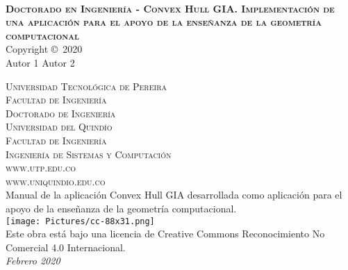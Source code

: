 
\newpage
~\vfill
\thispagestyle{empty}

\noindent \textbf{\textsc{Doctorado en Ingeniería - Convex Hull GIA. Implementación de una aplicación para el apoyo de la enseñanza de la geometría computacional}}\\ %

\noindent Copyright \copyright\ 2020\\
Autor 1
Autor 2

\noindent \textsc{Universidad Tecnológica de Pereira \\ Facultad de Ingeniería \\Doctorado de Ingeniería}\\
\noindent \textsc{Universidad del Quindío \\ Facultad de Ingeniería \\Ingeniería de Sistemas y Computación}\\

\noindent \textsc{www.utp.edu.co}\\
\noindent \textsc{www.uniquindio.edu.co}\\

\noindent Manual de la aplicación Convex Hull GIA desarrollada como aplicación para el apoyo de la enseñanza de la geometría computacional.\\


\texttt{[image: Pictures/cc-88x31.png]}\\
\noindent Este obra está bajo una licencia de Creative Commons Reconocimiento No Comercial 4.0 Internacional.\\

\noindent \textit{Febrero 2020}
